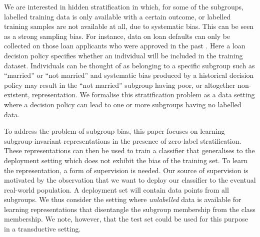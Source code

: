 We are interested in hidden stratification in which, for some of the subgroups, labelled training data is only available with a certain outcome, or labelled training samples are not available at all, due to systematic bias.
This can be seen as a strong sampling bias.
%
For instance, data on loan defaults can only be collected on those loan
applicants who were approved in the past \citep{kallus2018residual}.
%
Here a loan decision policy specifies whether an individual will be included in the training dataset.
%
Individuals can be thought of as belonging to a specific subgroup such as ``married'' or ``not married'' and systematic bias produced by a historical decision policy may result in the ``not married'' subgroup having poor, or altogether non-existent, representation.
%
%
%
%
We formalise this stratification problem as a data setting where a decision policy can lead to one or more subgroups having no labelled data.

To address the problem of subgroup bias, this paper focuses on learning subgroup-invariant representations in the presence of zero-label stratification.
These representations can then be used to train a classifier that generalises to the deployment setting which does not exhibit the bias of the training set.
%
To learn the representation, a form of supervision is needed.
Our source of supervision is motivated by the observation that we want to deploy our classifier to the eventual real-world population.
%
A deployment set will contain data points from all subgroups.
%
We thus consider the setting where \emph{unlabelled} data is available for learning representations that disentangle the subgroup membership from the class membership. We note, however, that the test set could be used for this purpose in a transductive setting.

